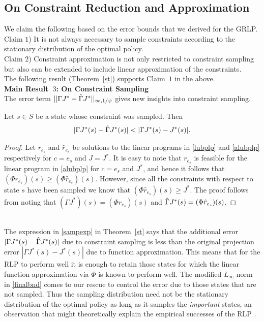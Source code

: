 \documentclass[12pt,draftcls,onecolumn]{IEEEtran}
\begin{document}
\subsection{On Constraint Reduction and Approximation}
We claim the following based on the error bounds that we derived for the GRLP.\\
{Claim $1$)} It is not always necessary to sample constraints according to the stationary distribution of the optimal policy.\\
{Claim $2$)} Constraint approximation is not only restricted to constraint sampling but also can be extended to include linear approximation of the constraints.\\
The following result (Theorem~\ref{st}) supports Claim~$1$ in the above.\\
\textbf{Main Result~$3$: On Constraint Sampling}\\
The error term $||\Gamma J^*-\hat{\Gamma} J^*||_{\infty,1/\psi}$ gives new insights into constraint sampling. 
\begin{theorem}\label{st}
Let $s\in S$ be a state whose constraint was sampled. Then
\begin{align}\label{sampexp}
|\Gamma J^*(s)-\hg J^*(s)|<|\Gamma J^*(s)-J^*(s)|.
\end{align}
\end{theorem}
\begin{proof}
Let $r_{e_s}$ and $\hat{r}_{e_s}$ be solutions to the linear programs in \eqref{lubplp} and \eqref{alubplp} respectively for $c=e_s$ and $J=J^*$. It is easy to note that $r_{e_s}$ is feasible for the linear program in \eqref{alubplp} for $c=e_s$ and $J^*$, and hence it follows that $(\Phi r_{e_s})(s)\geq (\Phi \hat{r}_{e_s})(s)$. However, since all the constraints with respect to state $s$ have been sampled we know that $(\Phi \hat{r}_{e_s})(s)\geq J^*$. The proof follows from noting that $(\Gamma J^*)(s)=(\Phi r_{e_s})(s)$ and $\hat{\Gamma} J^*(s)=(\Phi \hat{r}_{e_s})(s)$.
\end{proof}\\
The expression in \eqref{sampexp} in Theorem~\ref{st} says that the additional error $|\Gamma J^*(s) -\hat{\Gamma} J^*(s)|$ due to constraint sampling is less than the original projection error $|\Gamma J^*(s)-J^*(s)|$ due to function approximation. This means that for the RLP to perform well it is enough to retain those states for which the linear function approximation via $\Phi$ is known to perform well. The modified $L_\infty$ norm in \eqref{finalbnd} comes to our rescue to control the error due to those states that are not sampled. Thus the sampling distribution need not be the stationary distribution of the optimal policy as long as it samples the \emph{important} states, an observation that might theoretically explain the empirical successes of the RLP \cite{ALP,CST,SALP}.\\
\end{document}

